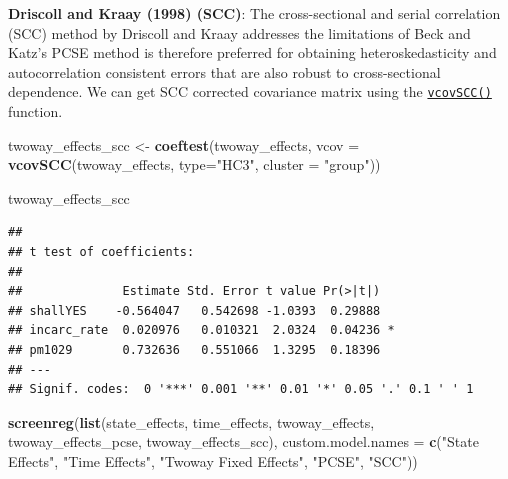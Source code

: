 \documentclass[]{article}
\newenvironment{Shaded}{\begin{snugshade}}{\end{snugshade}}
\newcommand{\KeywordTok}[1]{\textcolor[rgb]{0.13,0.29,0.53}{\textbf{{#1}}}}
\newcommand{\DataTypeTok}[1]{\textcolor[rgb]{0.13,0.29,0.53}{{#1}}}
\newcommand{\StringTok}[1]{\textcolor[rgb]{0.31,0.60,0.02}{{#1}}}
\newcommand{\NormalTok}[1]{{#1}}
\theoremstyle{definition}
\theoremstyle{definition}
\theoremstyle{remark}
\begin{document}
\textbf{Driscoll and Kraay (1998) (SCC)}: The cross-sectional and serial
correlation (SCC) method by Driscoll and Kraay addresses the limitations
of Beck and Katz's PCSE method is therefore preferred for obtaining
heteroskedasticity and autocorrelation consistent errors that are also
robust to cross-sectional dependence. We can get SCC corrected
covariance matrix using the
\href{http://bit.ly/r_vcovSCC}{\texttt{vcovSCC()}} function.

\begin{Shaded}
\begin{Highlighting}[]
\NormalTok{twoway_effects_scc <-}\StringTok{ }\KeywordTok{coeftest}\NormalTok{(twoway_effects,}
                               \DataTypeTok{vcov =} \KeywordTok{vcovSCC}\NormalTok{(twoway_effects, }
                                              \DataTypeTok{type=}\StringTok{"HC3"}\NormalTok{, }
                                              \DataTypeTok{cluster =} \StringTok{"group"}\NormalTok{))}

\NormalTok{twoway_effects_scc}
\end{Highlighting}
\end{Shaded}

\begin{verbatim}
## 
## t test of coefficients:
## 
##              Estimate Std. Error t value Pr(>|t|)  
## shallYES    -0.564047   0.542698 -1.0393  0.29888  
## incarc_rate  0.020976   0.010321  2.0324  0.04236 *
## pm1029       0.732636   0.551066  1.3295  0.18396  
## ---
## Signif. codes:  0 '***' 0.001 '**' 0.01 '*' 0.05 '.' 0.1 ' ' 1
\end{verbatim}

\begin{Shaded}
\begin{Highlighting}[]
\KeywordTok{screenreg}\NormalTok{(}\KeywordTok{list}\NormalTok{(state_effects, }
               \NormalTok{time_effects, }
               \NormalTok{twoway_effects, }
               \NormalTok{twoway_effects_pcse, }
               \NormalTok{twoway_effects_scc), }
          \DataTypeTok{custom.model.names =} \KeywordTok{c}\NormalTok{(}\StringTok{"State Effects"}\NormalTok{, }
                                 \StringTok{"Time Effects"}\NormalTok{, }
                                 \StringTok{"Twoway Fixed Effects"}\NormalTok{, }
                                 \StringTok{"PCSE"}\NormalTok{, }
                                 \StringTok{"SCC"}\NormalTok{))}
\end{Highlighting}
\end{Shaded}
\end{document}
